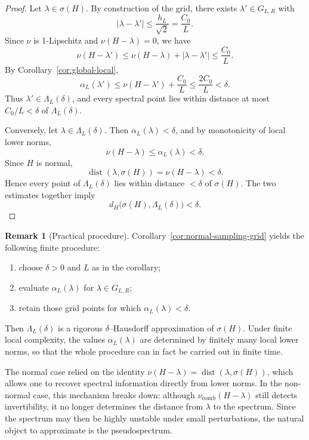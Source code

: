 \documentclass[11pt]{article}
\theoremstyle{definition}
\newtheorem{remark}[theorem]{Remark}
\newcommand{\dist}{\operatorname{dist}}
\newcommand{\nuop}{\nu}
\begin{document}
\begin{proof}
Let $\lambda\in\sigma(H)$. By construction of the grid, there exists
$\lambda'\in G_{L,R}$ with
\[
  |\lambda-\lambda'|\le \frac{h_L}{\sqrt2}=\frac{C_0}{L}.
\]
Since $\nuop$ is 1-Lipschitz and $\nuop(H-\lambda)=0$, we have
\[
  \nuop(H-\lambda')\le \nuop(H-\lambda) + |\lambda-\lambda'|\le \frac{C_0}{L}.
\]
By Corollary~\ref{cor:global-local},
\[
  \alpha_L(\lambda')
  \le
  \nuop(H-\lambda')+\frac{C_0}{L}
  \le
  \frac{2C_0}{L}
  <\delta.
\]
Thus $\lambda'\in\Lambda_L(\delta)$, and every spectral point lies within
distance at most $C_0/L<\delta$ of $\Lambda_L(\delta)$.

Conversely, let $\lambda\in\Lambda_L(\delta)$. Then $\alpha_L(\lambda)<\delta$,
and by monotonicity of local lower norms,
\[
  \nuop(H-\lambda)\le \alpha_L(\lambda)<\delta.
\]
Since $H$ is normal,
\[
  \dist(\lambda,\sigma(H))=\nuop(H-\lambda)<\delta.
\]
Hence every point of $\Lambda_L(\delta)$ lies within distance $<\delta$ of
$\sigma(H)$. The two estimates together imply
\[
  d_H\bigl(\sigma(H),\Lambda_L(\delta)\bigr)<\delta.
\]
\end{proof}

\begin{remark}[Practical procedure]
\label{rem:sampling-procedure}
Corollary~\ref{cor:normal-sampling-grid} yields the following finite procedure:
\begin{enumerate}
\item choose $\delta>0$ and $L$ as in the corollary;
\item evaluate $\alpha_L(\lambda)$ for $\lambda\in G_{L,R}$;
\item retain those grid points for which $\alpha_L(\lambda)<\delta$.
\end{enumerate}
Then $\Lambda_L(\delta)$ is a rigorous $\delta$--Hausdorff approximation of $\sigma(H)$. Under finite local complexity, the values $\alpha_L(\lambda)$ are determined by finitely many local lower norms, so that the whole procedure can in fact be carried out in finite time.
\end{remark}


The normal case relied on the identity
$\nu(H-\lambda)=\dist(\lambda,\sigma(H))$,
which allows one to recover spectral information directly from lower norms. In the non-normal case, this mechanism breaks down: although $\nu_{\mathrm{comb}}(H-\lambda)$ still detects invertibility, it no longer determines the distance from $\lambda$ to the spectrum. Since the spectrum may then be highly unstable under small perturbations, the natural object to approximate is the pseudospectrum.
\end{document}

